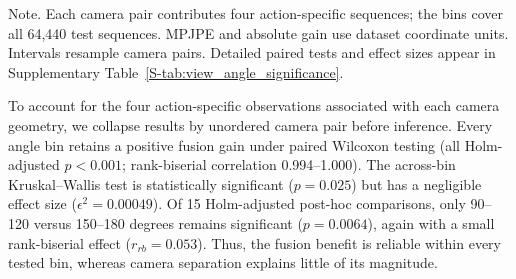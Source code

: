 \documentclass[preprint,12pt]{elsarticle}
\renewcommand{\textit}[1]{\textup{#1}}
\providecommand{\DIFdelbegin}{} %
\begin{document}
\begin{table}[t]
\centering
\caption{Accuracy and camera-pair bootstrap intervals by azimuth separation. Positive gain favors CanonFuse3D.}
\label{tab:view_angle}
\small
\setlength{\tabcolsep}{4pt}
\vspace{0.3em}
\begin{minipage}{0.97\linewidth}
\footnotesize\textit{Note.} Each camera pair contributes four action-specific sequences; the bins cover all 64,440 test sequences. MPJPE and absolute gain use dataset coordinate units. Intervals resample camera pairs. Detailed paired tests and effect sizes appear in Supplementary Table~\ref{S-tab:view_angle_significance}.
\end{minipage}
\end{table}



To account for the four action-specific observations associated with each camera geometry, we collapse results by unordered camera pair before inference. Every angle bin retains a positive fusion gain under paired Wilcoxon testing (all Holm-adjusted \(p<0.001\); rank-biserial correlation 0.994--1.000). The across-bin Kruskal--Wallis test is statistically significant (\(p=0.025\)) but has a negligible effect size (\(\epsilon^2=0.00049\)). Of 15 Holm-adjusted post-hoc comparisons, only 90--120 versus 150--180 degrees remains significant (\(p=0.0064\)), again with a small rank-biserial effect (\(r_{rb}=0.053\)). Thus, the fusion benefit is reliable within every tested bin, whereas camera separation explains little of its magnitude. \DIFdelbegin %
\end{document}
